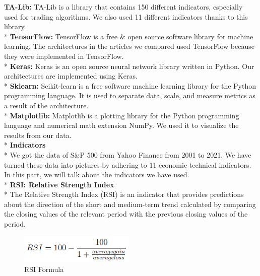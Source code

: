 \documentclass{article}
\begin{document}
\textbf{TA-Lib:} TA-Lib is a library that contains 150 different indicators, especially used for trading algorithms. We also used 11 different indicators thanks to this library.\vspace{0.1cm}\\*
\textbf{TensorFlow:} TensorFlow is a free \& open source software library for machine learning. The architectures in the articles we compared used TensorFlow because they were implemented in TensorFlow.\vspace{0.1cm}\\*
\textbf{Keras:} Keras is an open source neural network library written in Python. Our architectures are implemented using Keras.\vspace{0.1cm}\\*
\textbf{Sklearn:} Scikit-learn is a free software machine learning library for the Python programming language. It is used to separate data, scale, and measure metrics as a result of the architecture.\vspace{0.1cm}\\*
\textbf{Matplotlib:} Matplotlib is a plotting library for the Python programming language and numerical math extension NumPy. We used it to visualize the results from our data.\vspace{0.5cm}\\*
\textbf{\large Indicators} \vspace{0.1cm}\\*
We got the data of S\&P 500 from Yahoo Finance from 2001 to 2021. We have turned these data into pictures by adhering to 11 economic technical indicators. In this part, we will talk about the indicators we have used.\vspace{0.3cm}\\*
\textbf{RSI: Relative Strength Index}\\*
The Relative Strength Index (RSI) is an indicator that provides predictions about the direction of the short and medium-term trend calculated by comparing the closing values of the relevant period with the previous closing values of the period.
\begin{figure}[H]
\begin{center}
   \includegraphics[width=55mm,scale=0.5]{assets/formulas/rsi.png}
   \caption{RSI Formula}
\end{center}
\end{figure}
\end{document}

